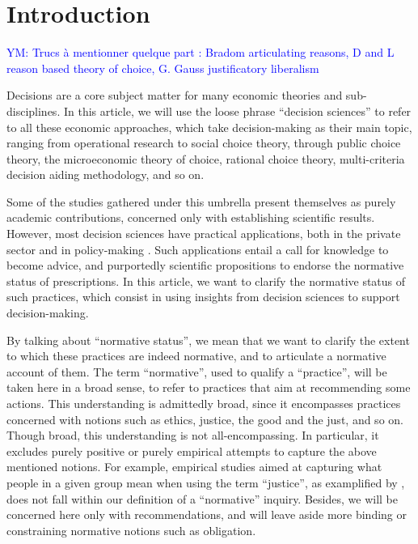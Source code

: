 \documentclass[preprint, french, english, 11pt, authoryear]{elsarticle}%
\newcommand{\commentYM}[1]{\textcolor{blue}{YM: #1}}
\begin{document}
\section{Introduction}
\commentYM{Trucs à mentionner quelque part : Bradom articulating reasons, D and L reason based theory of choice, G. Gauss justificatory liberalism}

Decisions are a core subject matter for many economic theories and sub-disciplines. In this article, we will use the loose phrase ``decision sciences'' to refer to all these economic approaches, which take decision-making as their main topic, ranging from operational research to social choice theory, through public choice theory, the microeconomic theory of choice, rational choice theory, multi-criteria decision aiding methodology, and so on.

Some of the studies gathered under this umbrella present themselves as purely academic contributions, concerned only with establishing scientific results. However, most decision sciences have practical applications, both in the private sector and in policy-making \citep{tsoukias_policy_2013,marchi_evidence-based_2016}. Such applications entail a call for knowledge to become advice, and purportedly scientific propositions to endorse the normative status of prescriptions. 
In this article, we want to clarify the normative status of such practices, which consist in using insights from decision sciences to support decision-making.

By talking about ``normative status'', we mean that we want to clarify the extent to which these practices are indeed normative, and to articulate a normative account of them. 
The term ``normative'', used to qualify a “practice”, will be taken here in a broad sense, to refer to practices that aim at recommending some actions. This understanding is admittedly broad, since it encompasses practices concerned with notions such as ethics, justice, the good and the just, and so on. 
Though broad, this understanding is not all-encompassing. In particular, it excludes purely positive or purely empirical attempts to capture the above mentioned notions. For example, empirical studies aimed at capturing what people in a given group mean when using the term ``justice'', as examplified by \citet{gaertner_empirical_2012}, does not fall within our definition of a ``normative'' inquiry. Besides, we will be concerned here only with recommendations, and will leave aside more binding or constraining normative notions such as obligation.
\end{document}
